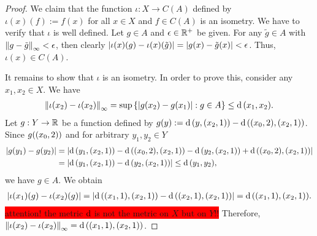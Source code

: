 \begin{proof}
	We claim that the function $\iota: X \to C(A)$ defined by $\iota(x)(f) := f(x)$ for all $x \in X$ and $f \in C(A)$ is an isometry. We have to verify that $\iota$ is well defined. Let $g \in A$ and $\epsilon \in \R^+$ be given. For any $\tilde{g} \in A$ with $\norm[\infty]{g - \tilde{g}} < \epsilon$, then clearly $\vbraces{\iota(x)(g) - \iota(x)\pbraces{\tilde{g}}} = \vbraces{g(x) - \tilde{g}(x)} < \epsilon$. Thus, $\iota(x) \in C(A)$.  
	
	It remains to show that $\iota$ is an isometry. In order to prove this, consider any $x_1, x_2 \in X$. We have 
	\begin{align*}
		\norm[\infty]{\iota\pbraces{x_2} - \iota\pbraces{x_2}} = \sup \Bbraces{\vbraces{g\pbraces{x_2} - g\pbraces{x_1}} : g \in A} \leq \metric\pbraces{x_1, x_2}.
	\end{align*} 
	Let $g: Y \to \R$ be a function defined by $g(y) := \metric\pbraces{y, \pbraces{x_2, 1}} - \metric\pbraces{\pbraces{x_0, 2}, \pbraces{x_2, 1}}$. Since $g\pbraces{\pbraces{x_0, 2}}$ and  for arbitrary $y_1, y_2 \in Y$
	\begin{align*}
		\vbraces{g\pbraces{y_1} - g\pbraces{y_2}} &= \vbraces{\metric\pbraces{y_1, \pbraces{x_2, 1}} - \metric\pbraces{\pbraces{x_0, 2}, \pbraces{x_2, 1}} - \metric\pbraces{y_2, \pbraces{x_2, 1}} + \metric\pbraces{\pbraces{x_0, 2}, \pbraces{x_2, 1}}} \\
		&= \vbraces{\metric\pbraces{y_1, \pbraces{x_2, 1}} - \metric\pbraces{y_2, \pbraces{x_2, 1}}} \leq \metric\pbraces{y_1, y_2},
	\end{align*}
	we have $g \in A$. We obtain
	\begin{align*}
		\vbraces{\iota(x_1)(g) - \iota(x_2)(g)} = \vbraces{\metric\pbraces{\pbraces{x_1, 1}, \pbraces{x_2, 1}} - \metric\pbraces{\pbraces{x_2, 1}, \pbraces{x_2, 1}}} = \metric\pbraces{\pbraces{x_1, 1}, \pbraces{x_2, 1}}.
	\end{align*}
	\colorbox{red}{attention! the metric $\metric$ is not the metric on $X$ but on $Y$!!} Therefore, $\norm[\infty]{\iota\pbraces{x_2} - \iota\pbraces{x_2}} = \metric\pbraces{\pbraces{x_1, 1}, \pbraces{x_2, 1}}$.
	

\end{proof}
